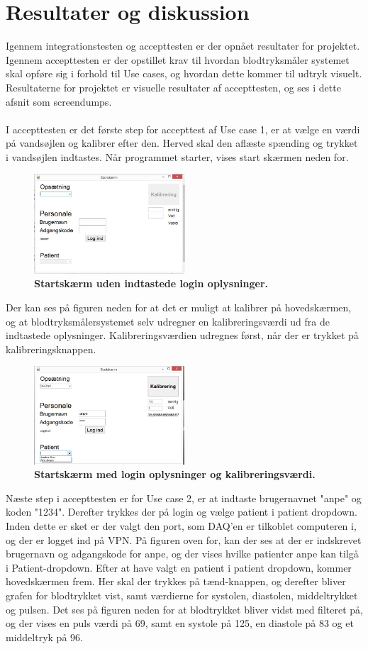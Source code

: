 \section{Resultater og diskussion}
Igennem integrationstesten og accepttesten er der opnået resultater for projektet. Igennem accepttesten er der opstillet krav til hvordan blodtryksmåler systemet skal opføre sig i forhold til Use cases, og hvordan dette kommer til udtryk visuelt. Resultaterne for projektet er visuelle resultater af accepttesten, og ses i dette afsnit som screendumps. \\\\
I accepttesten er det første step for accepttest af Use case 1, er at vælge en værdi på vandsøjlen og kalibrer efter den. Herved skal den aflæste spænding og trykket i vandsøjlen indtastes. Når programmet starter, vises start skærmen neden for.
\begin{figure}[H]
\includegraphics[width =0.5\textwidth , center]{billeder/ITstartGUI}
\caption{\textbf{Startskærm uden indtastede login oplysninger.}}
\end{figure}
Der kan ses på figuren neden for at det er muligt at kalibrer på hovedskærmen, og at blodtryksmålersystemet selv udregner en kalibreringsværdi ud fra de indtastede oplysninger. Kalibreringsværdien udregnes først, når der er trykket på kalibreringsknappen. 
\begin{figure}[H]
\includegraphics[width =0.5\textwidth , center]{billeder/ITstartGUIlogKali}
\caption{\textbf{Startskærm med login oplysninger og kalibreringsværdi.}}
\end{figure}
Næste step i accepttesten er for Use case 2, er at indtaste brugernavnet "anpe" og koden "1234". Derefter trykkes der på login og vælge patient i patient dropdown. Inden dette er sket er der valgt den port, som DAQ’en er tilkoblet computeren i, og der er logget ind på VPN. På figuren oven for, kan der ses at der er indskrevet brugernavn og adgangskode for anpe, og der vises hvilke patienter anpe kan tilgå i Patient-dropdown. Efter at have valgt en patient i patient dropdown, kommer hovedskærmen frem. Her skal der trykkes på tænd-knappen, og derefter bliver grafen for blodtrykket vist, samt værdierne for systolen, diastolen, middeltrykket og pulsen. Det ses på figuren neden for at blodtrykket bliver vidst med filteret på, og der vises en puls værdi på 69, samt en systole på 125, en diastole på 83 og et middeltryk på 96.
